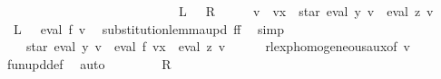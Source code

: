 \begin{isabellebody}
\ \ \ \ \ \ \ \ \ \ \ \ \ \ \ \ \ \ \ \ \ \ \ \ \ \ {\isacharparenleft}{\kern0pt}\ {\isachardoublequoteopen}{\isasymPsi}\ {\isacharquery}{\kern0pt}L\ {\isasymsubseteq}\ {\isasymPsi}\ {\isacharquery}{\kern0pt}R{\isachardoublequoteclose}{\isacharparenright}{\kern0pt}\isanewline
%
\isadelimproof
%
\endisadelimproof
%
\isatagproof
{}\isamarkupfalse%
\ {\isacharminus}{\kern0pt}\isanewline
\ \ \isamarkupfalse%
\ {\isacharquery}{\kern0pt}v{\isacharprime}{\kern0pt}\ {\isacharequal}{\kern0pt}\ {\isachardoublequoteopen}v{\isacharparenleft}{\kern0pt}x\ {\isacharcolon}{\kern0pt}{\isacharequal}{\kern0pt}\ star\ {\isacharparenleft}{\kern0pt}eval\ y\ v{\isacharparenright}{\kern0pt}\ {\isacharat}{\kern0pt}{\isacharat}{\kern0pt}\ eval\ z\ v{\isacharparenright}{\kern0pt}{\isachardoublequoteclose}\isanewline
\ \ \isamarkupfalse%
\ {\isachardoublequoteopen}{\isasymPsi}\ {\isacharquery}{\kern0pt}L\ {\isacharequal}{\kern0pt}\ {\isasymPsi}\ {\isacharparenleft}{\kern0pt}eval\ f\ {\isacharquery}{\kern0pt}v{\isacharprime}{\kern0pt}{\isacharparenright}{\kern0pt}{\isachardoublequoteclose}\ \isamarkupfalse%
\ substitution{\isacharunderscore}{\kern0pt}lemma{\isacharunderscore}{\kern0pt}upd{\isacharbrackleft}{\kern0pt}\ f{\isacharequal}{\kern0pt}f{\isacharbrackright}{\kern0pt}\ \isamarkupfalse%
\ simp\isanewline
\ \ \isamarkupfalse%
\ \isamarkupfalse%
\ {\isachardoublequoteopen}{\isasymdots}\ {\isasymsubseteq}\ {\isasymPsi}\ {\isacharparenleft}{\kern0pt}star\ {\isacharparenleft}{\kern0pt}eval\ y\ v{\isacharparenright}{\kern0pt}\ {\isacharat}{\kern0pt}{\isacharat}{\kern0pt}\ eval\ f\ {\isacharparenleft}{\kern0pt}{\isacharquery}{\kern0pt}v{\isacharprime}{\kern0pt}{\isacharparenleft}{\kern0pt}x\ {\isacharcolon}{\kern0pt}{\isacharequal}{\kern0pt}\ eval\ z\ v{\isacharparenright}{\kern0pt}{\isacharparenright}{\kern0pt}{\isacharparenright}{\kern0pt}{\isachardoublequoteclose}\isanewline
\ \ \ \ \isamarkupfalse%
\ rlexp{\isacharunderscore}{\kern0pt}homogeneous{\isacharunderscore}{\kern0pt}aux{\isacharbrackleft}{\kern0pt}of\ {\isacharquery}{\kern0pt}v{\isacharprime}{\kern0pt}{\isacharbrackright}{\kern0pt}\ \isamarkupfalse%
\ fun{\isacharunderscore}{\kern0pt}upd{\isacharunderscore}{\kern0pt}def\ \isamarkupfalse%
\ auto\isanewline
\ \ \isamarkupfalse%
\ \isamarkupfalse%
\ {\isachardoublequoteopen}{\isasymdots}\ {\isacharequal}{\kern0pt}\ {\isasymPsi}\ {\isacharquery}{\kern0pt}R{\isachardoublequoteclose}\ \isamarkupfalse%

\end{isabellebody}
